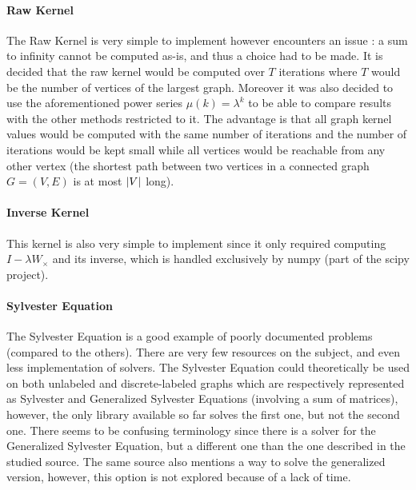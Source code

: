 \documentclass{article}
\DeclarePairedDelimiter{\abs}{\lvert}{\rvert}
\theoremstyle{definition}
\begin{document}
\paragraph{Raw Kernel}
The Raw Kernel is very simple to implement however encounters an issue : a sum to infinity cannot be computed as-is, and thus a choice had to be made. It is decided that the raw kernel would be computed over $T$ iterations where $T$ would be the number of vertices of the largest graph. Moreover it was also decided to use the aforementioned power series $\mu(k)=\lambda^k$ to be able to compare results with the other methods restricted to it. The advantage is that all graph kernel values would be computed with the same number of iterations and the number of iterations would be kept small while all vertices would be reachable from any other vertex (the shortest path between two vertices in a connected graph $G=(V,E)$ is at most $\abs{V}$ long).  
\paragraph{Inverse Kernel}
This kernel is also very simple to implement  since it only required computing $I-\lambda W_{\times}$ and its inverse, which is handled exclusively by numpy (part of the scipy project).
\paragraph{Sylvester Equation}
The Sylvester Equation is a good example of poorly documented problems (compared to the others). There are very few resources on the subject, and even less implementation of solvers. The Sylvester Equation could theoretically be used on both unlabeled and discrete-labeled graphs which are respectively represented as Sylvester and Generalized Sylvester Equations (involving a sum of matrices), however, the only library available so far solves the first one, but not the second one. There seems to be confusing terminology since there is a solver for the Generalized Sylvester Equation, but a different one than the one described in the studied source\cite{vishwanathan_graph_2010}. The same source also mentions a way to solve the generalized version\cite{lathauwer2004}, however, this option is not explored because of a lack of time.  
\end{document}
